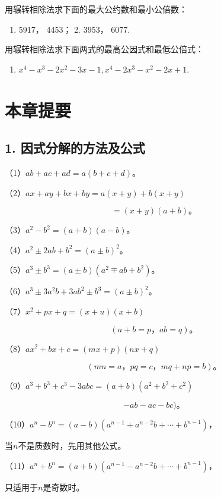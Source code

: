 用辗转相除法求下面的最大公约数和最小公倍数：

\begin{enumerate}
\item
  5917， 4453； 2. 3953， 6077.
\end{enumerate}

用辗转相除法求下面两式的最高公因式和最低公倍式：

\begin{enumerate}[start=3]
\item
  \(x^{4} - x^{3} - 2x^{2} - 3x - 1, x^{4} - 2x^{3} - x^{2} - 2x + 1.\)
\end{enumerate}

\section{本章提要}

\subsection{1. 因式分解的方法及公式}

（1）\(ab + ac + ad = a(b + c + d)\)。

（2）\(ax + ay + bx + by = a(x + y) + b(x + y)\)

\[
= (x + y) (a + b)\text{。}
\]

（3）\(a^2 - b^2 = (a + b)(a - b)\)。

（4）\(a^2 \pm 2ab + b^2 = (a \pm b)^2\)。

（5）\(a^3 \pm b^3 = (a \pm b)(a^2 \mp ab + b^2)\)。

（6）\(a^3 \pm 3a^2b + 3ab^2 \pm b^3 = (a \pm b)^2\)。

（7）\(x^{2} + px + q = (x + u)(x + b)\)

\[
(a + b = p\text{，} a b = q)\text{。}
\]

（8）\(ax^2 + bx + c = (mx + p)(nx + q)\)

\[
(m n = a\text{，} p q = c\text{，} m q + n p = b)\text{。}
\]

（9）\(a^3 + b^3 + c^3 - 3abc = (a + b)(a^2 + b^2 + c^2)\)

\[
- a b - a c - b c)\text{。}
\]

（10）\(a^n - b^n = (a - b)(a^{n-1} + a^{n-2}b + \cdots + b^{n-1})\)，

当\(n\)不是质数时，先用其他公式。

（11）\(a^n + b^n = (a + b)(a^{n-1} - a^{n-2}b + \cdots + b^{n-1})\)，

只适用于\(n\)是奇数时。

